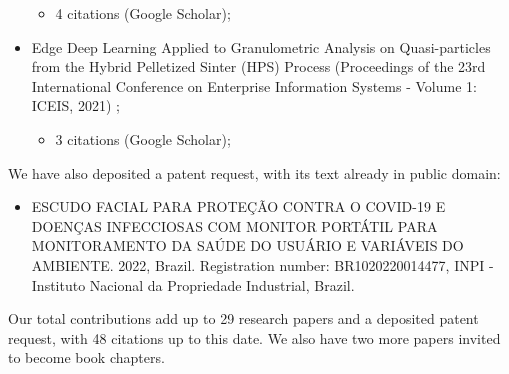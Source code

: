 \begin{itemize}
    \begin{itemize}
        \item 4 citations (Google Scholar);
    \end{itemize}
    \item Edge Deep Learning Applied to Granulometric Analysis on Quasi-particles from the Hybrid Pelletized Sinter (HPS) Process (Proceedings of the 23rd International Conference on Enterprise Information Systems - Volume 1: ICEIS, 2021) \cite{iceis21hps};
    \begin{itemize}
        \item 3 citations (Google Scholar);
    \end{itemize}
\end{itemize}

We have also deposited a patent request, with its text already in public domain:

\begin{itemize}
    \item ESCUDO FACIAL PARA PROTEÇÃO CONTRA O COVID-19 E DOENÇAS INFECCIOSAS COM MONITOR PORTÁTIL PARA MONITORAMENTO DA SAÚDE DO USUÁRIO E VARIÁVEIS DO AMBIENTE. 2022, Brazil. Registration number: BR1020220014477, INPI - Instituto Nacional da Propriedade Industrial, Brazil.
\end{itemize}

Our total contributions add up to 29 research papers and a deposited patent request, with 48 citations up to this date. We also have two more papers invited to become book chapters. 


\cleardoublepage